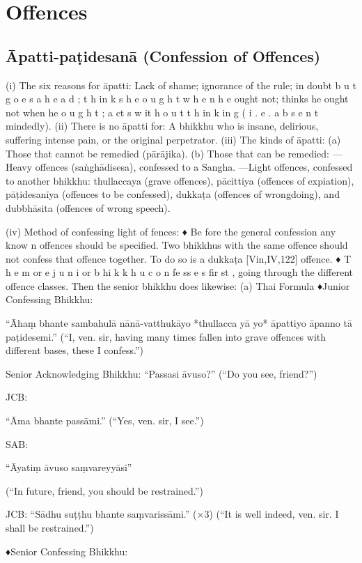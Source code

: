 \chapter{Offences}

\section{Āpatti-paṭidesanā (Confession of Offences)}

(i) The six reasons for āpatti:
Lack of shame; ignorance of the rule; in doubt
b u t g o e s a h e a d ; t h in k s h e o u g h t w h e n h e
ought not; thinks he ought not when he
o u g h t ; a ct s w it h o u t t h in k in g ( i . e . a b s e n t mindedly).
(ii) There is no āpatti for:
A bhikkhu who is insane, delirious, suffering
intense pain, or the original perpetrator.
(iii) The kinds of āpatti:
(a) Those that cannot be remedied (pārājika).
(b) Those that can be remedied:
—Heavy offences (saṅghādisesa),
confessed to a Sangha.
—Light offences, confessed to another bhikkhu:
thullaccaya (grave offences), pācittiya
(offences of expiation), pāṭidesanīya (offences
to be confessed), dukkaṭa (offences of wrongdoing), and dubbhāsita (offences of wrong
speech).

(iv) Method of confessing light of fences:
♦ Be fore the general confession any know n
offences should be specified. Two bhikkhus
with the same offence should not confess that
offence together. To do so is a dukkaṭa
[Vin,IV,122]
offence.
♦ T h e m or e j u n i or b hi k k h u c o n fe ss e s fir st ,
going through the different offence classes.
Then the senior bhikkhu does likewise:
(a) Thai Formula
♦Junior Confessing Bhikkhu:

“Āhaṃ bhante sambahulā nānā-vatthukāyo
*thullacca yā yo* āpattiyo āpanno tā
paṭidesemi.”
(“I, ven. sir, having many times fallen into grave
offences with different bases, these I confess.”)

Senior Acknowledging Bhikkhu:
“Passasi āvuso?”
(“Do you see, friend?”)

JCB:

“Āma bhante passāmi.”
(“Yes, ven. sir, I see.”)

SAB:

“Āyatiṃ āvuso saṃvareyyāsi”

(“In future, friend, you should be restrained.”)

JCB: “Sādhu suṭṭhu bhante saṃvarissāmi.” (×3)
(“It is well indeed, ven. sir. I shall be restrained.”)

♦Senior Confessing Bhikkhu:

